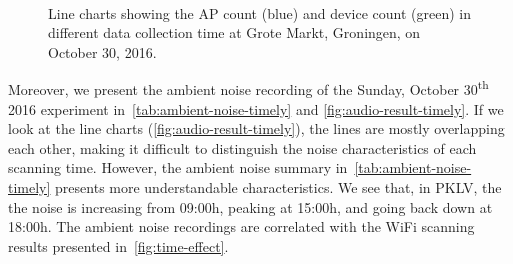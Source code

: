 \begin{figure}[H]
\begin{adjustwidth}{-3cm}{}
{{		  }
		}\\
		\caption[Line charts of ambient noise on October 30, 2016.]
		{Line charts showing the \ac{AP} count (blue) and device count (green) in different data collection time at Grote Markt, Groningen, on October 30, 2016.}
		\label{fig:time-effect}
		\end{adjustwidth}
	\end{figure}

	Moreover, we present the ambient noise recording of the Sunday, October 30\textsuperscript{th} 2016 experiment in~\autoref{tab:ambient-noise-timely} and \autoref{fig:audio-result-timely}. If we look at the line charts (\autoref{fig:audio-result-timely}), the lines are mostly overlapping each other, making it difficult to distinguish the noise characteristics of each scanning time. However, the ambient noise summary in~\autoref{tab:ambient-noise-timely} presents more understandable characteristics. We see that, in \ac{PKLV}, the the noise is increasing from 09:00h, peaking at 15:00h, and going back down at 18:00h. The ambient noise recordings are correlated with the WiFi scanning results presented in~\autoref{fig:time-effect}.


